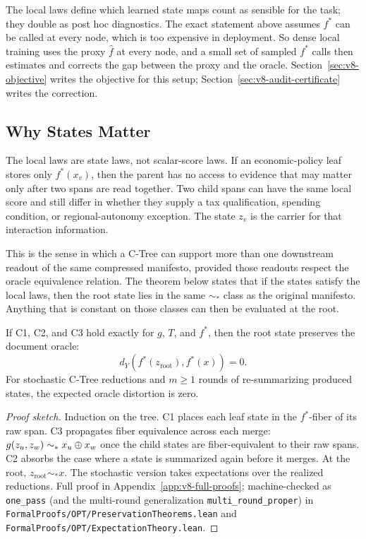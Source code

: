 The local laws define which learned state maps count as sensible for
the task; they double as post hoc diagnostics. The exact statement
above assumes \(f^\ast\) can be called at every node, which is too
expensive in deployment. So dense local training uses the proxy
\(\widehat f\) at every node, and a small set of sampled \(f^\ast\)
calls then estimates and corrects the gap between the proxy and the
oracle. Section~\ref{sec:v8-objective} writes the objective for this
setup; Section~\ref{sec:v8-audit-certificate} writes the correction.

\subsection{Why States Matter}

The local laws are state laws, not scalar-score laws. If an economic-policy
leaf stores only \(f^\ast(x_v)\), then the parent has no access to evidence
that may matter only after two spans are read together. Two child spans can
have the same local score and still differ in whether they supply a tax
qualification, spending condition, or regional-autonomy exception. The state
\(z_v\) is the carrier for that interaction information.

This is the sense in which a C-Tree can support more than one downstream
readout of the same compressed manifesto, provided those readouts
respect the oracle equivalence relation. The theorem below states that
if the states satisfy the local laws, then the root state lies in the
same \(\sim_\ast\) class as the original manifesto. Anything that is
constant on those classes can then be evaluated at the root.

\begin{theorem}\label{thm:v8-root-preservation}
If C1, C2, and C3 hold exactly for \(g\), \(T\), and \(f^\ast\), then the root
state preserves the document oracle:
\[
  d_Y\!\left(f^\ast(z_{\mathrm{root}}),f^\ast(x)\right)=0 .
\]
For stochastic C-Tree reductions and \(m\ge 1\) rounds of
re-summarizing produced states, the expected oracle distortion is
zero.
\end{theorem}

\begin{proof}[Proof sketch]
Induction on the tree. C1 places each leaf state in the
\(f^\ast\)-fiber of its raw span. C3 propagates fiber equivalence
across each merge: \(g(z_u,z_w)\sim_\ast x_u\oplus x_w\) once the
child states are fiber-equivalent to their raw spans. C2 absorbs the
case where a state is summarized again before it merges. At the root,
\(z_{\mathrm{root}}\sim_\ast x\). The stochastic version takes
expectations over the realized reductions. Full proof in
Appendix~\ref{app:v8-full-proofs}; machine-checked as
\texttt{one\_pass} (and the multi-round generalization
\texttt{multi\_round\_proper}) in
\texttt{FormalProofs/OPT/PreservationTheorems.lean} and
\texttt{FormalProofs/OPT/ExpectationTheory.lean}.
\end{proof}

